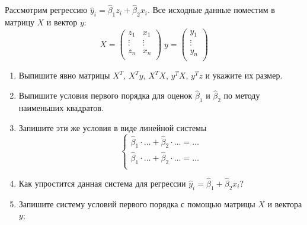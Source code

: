 \documentclass[12pt]{article}
\newcommand{\hb}{\hat{\beta}}
\newcommand{\hy}{\hat{y}}
\begin{document}
\begin{problem}
    
    Рассмотрим регрессию $\hy_i = \hb_1 z_i + \hb_2 x_i$.
    Все исходные данные поместим в матрицу $X$ и вектор $y$:
    \[
    X = \begin{pmatrix}
    z_1 & x_1 \\
    \vdots & \vdots \\
    z_n & x_n \\
    \end{pmatrix} \;
    y = \begin{pmatrix}
    y_1 \\
    \vdots \\
    y_n \\
    \end{pmatrix}
    \]
    \begin{enumerate}
      \item Выпишите явно матрицы $X^T$, $X^T y$, $X^T X$, $y^T X$, $y^T z$ и укажите их размер.
      \item Выпишите условия первого порядка для оценок $\hb_1$ и $\hb_2$ по методу наименьших квадратов.
      \item Запишите эти же условия в виде линейной системы
      \[
    \begin{cases}
    \hb_1 \cdot \ldots + \hb_2 \cdot \ldots = \ldots \\
    \hb_1 \cdot \ldots + \hb_2 \cdot \ldots = \ldots \\
    \end{cases}
      \]
      \item Как упростится данная система для регрессии $\hy_i = \hb_1 + \hb_2 x_i$?
      \item Запишите систему условий первого порядка с помощью матрицы $X$ и вектора $y$;
    \end{enumerate}    
\end{problem}
\end{document}
